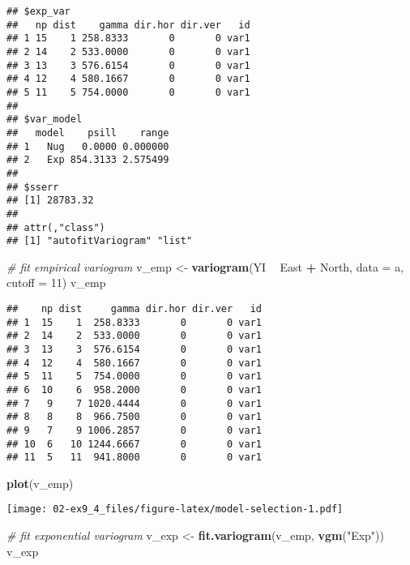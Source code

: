 \documentclass[]{book}
\newenvironment{Shaded}{\begin{snugshade}}{\end{snugshade}}
\newcommand{\CommentTok}[1]{\textcolor[rgb]{0.56,0.35,0.01}{\textit{#1}}}
\newcommand{\DataTypeTok}[1]{\textcolor[rgb]{0.13,0.29,0.53}{#1}}
\newcommand{\DecValTok}[1]{\textcolor[rgb]{0.00,0.00,0.81}{#1}}
\newcommand{\KeywordTok}[1]{\textcolor[rgb]{0.13,0.29,0.53}{\textbf{#1}}}
\newcommand{\NormalTok}[1]{#1}
\newcommand{\OperatorTok}[1]{\textcolor[rgb]{0.81,0.36,0.00}{\textbf{#1}}}
\newcommand{\StringTok}[1]{\textcolor[rgb]{0.31,0.60,0.02}{#1}}
\begin{document}
\begin{verbatim}
## $exp_var
##   np dist    gamma dir.hor dir.ver   id
## 1 15    1 258.8333       0       0 var1
## 2 14    2 533.0000       0       0 var1
## 3 13    3 576.6154       0       0 var1
## 4 12    4 580.1667       0       0 var1
## 5 11    5 754.0000       0       0 var1
## 
## $var_model
##   model    psill    range
## 1   Nug   0.0000 0.000000
## 2   Exp 854.3133 2.575499
## 
## $sserr
## [1] 28783.32
## 
## attr(,"class")
## [1] "autofitVariogram" "list"
\end{verbatim}

\begin{Shaded}
\begin{Highlighting}[]
\CommentTok{# fit empirical variogram}
\NormalTok{v_emp <-}\StringTok{ }\KeywordTok{variogram}\NormalTok{(YI }\OperatorTok{~}\StringTok{ }\NormalTok{East }\OperatorTok{+}\StringTok{ }\NormalTok{North, }\DataTypeTok{data =}\NormalTok{ a, }\DataTypeTok{cutoff =} \DecValTok{11}\NormalTok{)}
\NormalTok{v_emp}
\end{Highlighting}
\end{Shaded}

\begin{verbatim}
##    np dist     gamma dir.hor dir.ver   id
## 1  15    1  258.8333       0       0 var1
## 2  14    2  533.0000       0       0 var1
## 3  13    3  576.6154       0       0 var1
## 4  12    4  580.1667       0       0 var1
## 5  11    5  754.0000       0       0 var1
## 6  10    6  958.2000       0       0 var1
## 7   9    7 1020.4444       0       0 var1
## 8   8    8  966.7500       0       0 var1
## 9   7    9 1006.2857       0       0 var1
## 10  6   10 1244.6667       0       0 var1
## 11  5   11  941.8000       0       0 var1
\end{verbatim}

\begin{Shaded}
\begin{Highlighting}[]
\KeywordTok{plot}\NormalTok{(v_emp)}
\end{Highlighting}
\end{Shaded}

\texttt{[image: 02-ex9\_4\_files/figure-latex/model-selection-1.pdf]}

\begin{Shaded}
\begin{Highlighting}[]
\CommentTok{# fit exponential variogram}
\NormalTok{v_exp <-}\StringTok{ }\KeywordTok{fit.variogram}\NormalTok{(v_emp, }\KeywordTok{vgm}\NormalTok{(}\StringTok{"Exp"}\NormalTok{))}
\NormalTok{v_exp}
\end{Highlighting}
\end{Shaded}
\end{document}
